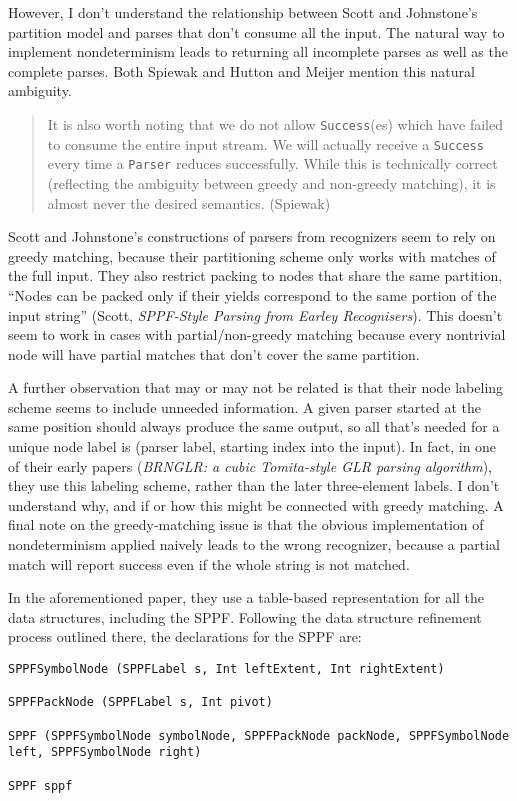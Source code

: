 \documentclass[12pt]{article}
\begin{document}
However, I don't understand the relationship between Scott and
Johnstone's partition model and parses that don't consume all the
input.  The natural way to implement nondeterminism leads to returning
all incomplete parses as well as the complete parses.  Both Spiewak
and Hutton and Meijer mention this natural ambiguity.

\begin{quote}
  It is also worth noting that we do not allow \texttt{Success}(es)
  which have failed to consume the entire input stream.  We will
  actually receive a \texttt{Success} every time a \texttt{Parser}
  reduces successfully. While this is technically correct (reflecting
  the ambiguity between greedy and non-greedy matching), it is almost
  never the desired semantics.  (Spiewak)
\end{quote}

Scott and Johnstone's constructions of parsers from recognizers seem
to rely on greedy matching, because their partitioning scheme only
works with matches of the full input.  They also restrict packing to
nodes that share the same partition, ``Nodes can be packed only if
their yields correspond to the same portion of the input string''
(Scott, \emph{SPPF-Style Parsing from Earley Recognisers}).  This
doesn't seem to work in cases with partial/non-greedy matching because
every nontrivial node will have partial matches that don't cover the
same partition.

A further observation that may or may not be related is that their
node labeling scheme seems to include unneeded information.  A given
parser started at the same position should always produce the same
output, so all that's needed for a unique node label is (parser label,
starting index into the input).  In fact, in one of their early papers
(\emph{BRNGLR: a cubic Tomita-style GLR parsing algorithm}), they use
this labeling scheme, rather than the later three-element labels.  I
don't understand why, and if or how this might be connected with
greedy matching.  A final note on the greedy-matching issue is
that the obvious implementation of nondeterminism applied naively
leads to the wrong recognizer, because a partial match will report
success even if the whole string is not matched.

In the aforementioned paper, they use a table-based representation
for all the data structures, including the SPPF.  Following the data
structure refinement process outlined there, the declarations for the
SPPF are:

\begin{verbatim}
SPPFSymbolNode (SPPFLabel s, Int leftExtent, Int rightExtent)

SPPFPackNode (SPPFLabel s, Int pivot)

SPPF (SPPFSymbolNode symbolNode, SPPFPackNode packNode, SPPFSymbolNode left, SPPFSymbolNode right)

SPPF sppf
\end{verbatim}
\end{document}

